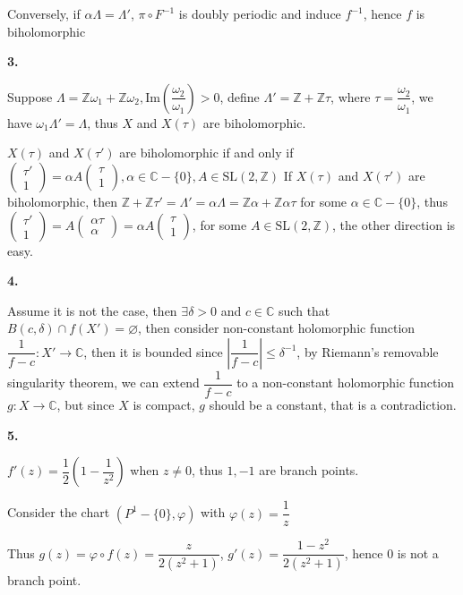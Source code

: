 \documentclass{article}
\begin{document}
Conversely, if \(\alpha\Lambda=\Lambda'\), $\pi\circ F^{-1}$ is doubly periodic and induce $f^{-1}$, hence $f$ is biholomorphic \par
\textbf{3.} \par
Suppose $\Lambda=\mathbb{Z}\omega_{1}+\mathbb{Z}\omega_{2}, \mathrm{Im}\left(\dfrac{\omega_{2}}{\omega_{1}}\right)>0$, define $\Lambda'=\mathbb{Z}+\mathbb{Z}\tau$, where $\tau=\dfrac{\omega_{2}}{\omega_{1}}$, we have $\omega_{1}\Lambda'=\Lambda$, thus $X$ and $X(\tau)$ are biholomorphic. \par
$X(\tau)$ and $X(\tau')$ are biholomorphic if and only if $\begin{pmatrix}
\tau'\\ 
1
\end{pmatrix}
=\alpha A
\begin{pmatrix}
\tau\\ 
1
\end{pmatrix}, \alpha\in \mathbb{C}-\{0\}, A\in \mathrm{SL}(2,\mathbb{Z})$
If $X(\tau)$ and $X(\tau')$ are biholomorphic, then $\mathbb{Z}+\mathbb{Z}\tau'=\Lambda'=\alpha\Lambda=\mathbb{Z}\alpha+\mathbb{Z}\alpha\tau$ for some $\alpha\in \mathbb{C}-\{0\}$, thus $\begin{pmatrix}
\tau'\\ 
1
\end{pmatrix}
=
A
\begin{pmatrix}
\alpha\tau\\ 
\alpha
\end{pmatrix}
=\alpha A
\begin{pmatrix}
\tau\\ 
1
\end{pmatrix}$, for some $A\in \mathrm{SL}(2,\mathbb{Z})$, the other direction is easy. \par
\textbf{4.} \par
Assume it is not the case, then $\exists \delta>0$ and $c\in\mathbb{C}$ such that $B(c,\delta) \cap f(X') = \varnothing$, then consider non-constant holomorphic function $\dfrac{1}{f-c}:X'\rightarrow \mathbb{C}$, then it is bounded since $\left| \dfrac{1}{f-c} \right| \leq \delta^{-1}$, by Riemann's removable singularity theorem, we can extend \(\dfrac{1}{f-c}\) to a non-constant holomorphic function $g:X\rightarrow \mathbb{C}$, but since $X$ is compact, $g$ should be a constant, that is a contradiction. \par
\textbf{5.} \par
$f'(z)=\dfrac{1}{2}\left(1-\dfrac{1}{z^{2}}\right)$ when $z\neq0$, thus $1,-1$ are branch points. \par
Consider the chart $({P}^{1}-\{0\},\varphi)$ with $\varphi(z)=\dfrac{1}{z}$

\begin{center}
\end{center}

Thus $g(z)=\varphi\circ f(z)=\dfrac{z}{2(z^{2}+1)}$, $g'(z)=\dfrac{1-z^{2}}{2(z^{2}+1)}$, hence \(0\) is not a branch point.
\end{document}
